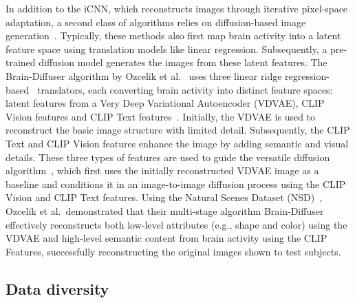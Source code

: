 In addition to the iCNN, which reconstructs images through iterative pixel-space adaptation, a second class of algorithms relies on diffusion-based image generation~\cite{takagiHighResolutionImageReconstruction,ozcelikNaturalSceneReconstruction2023,scottiMindEye2SharedSubjectModels2024}. Typically, these methods also first map brain activity into a latent feature space using translation models like linear regression. Subsequently, a pre-trained diffusion model generates the images from these latent features. The Brain-Diffuser algorithm by Ozcelik et al.~\cite{ozcelikNaturalSceneReconstruction2023} uses three linear ridge regression-based~\cite{hoerlRidgeRegressionBiased1970} translators, each converting brain activity into distinct feature spaces: latent features from a Very Deep Variational Autoencoder (VDVAE)\cite{childVeryDeepVAEs2020},  CLIP Vision features and CLIP Text features~\cite{radfordLearningTransferableVisual2021}. Initially, the VDVAE is used to reconstruct the basic image structure with limited detail. Subsequently, the CLIP Text and CLIP Vision features enhance the image by adding semantic and visual details. These three types of features are used to guide the versatile diffusion algorithm~\cite{xuVersatileDiffusionText2024}, which first uses the initially reconstructed VDVAE image as a baseline and conditions it in an image-to-image diffusion process using the CLIP Vision and CLIP Text features. Using the Natural Scenes Dataset (NSD)~\cite{allenMassive7TFMRI2022}, Ozcelik et al.\ demonstrated that their multi-stage algorithm Brain-Diffuser effectively reconstructs both low-level attributes (e.g., shape and color) using the VDVAE and high-level semantic content from brain activity using the CLIP Features, successfully reconstructing the original images shown to test subjects.

\subsection{Data diversity}

